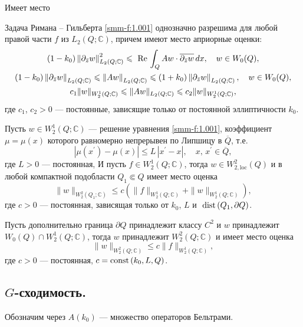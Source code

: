 Имеет место


\begin{theorem}\label{smm-th1.1}
Задача Римана -- Гильберта { \eqref{smm-f:1.001}} однозначно разрешима для любой правой части $f$ из $L_2(Q;\mathbb{C})$,
причем имеют место априорные оценки:
\begin{gather*}
(1-k_0)\left\|\partial_{\bar{z}}w\right\|^2_{L_2(Q;\mathbb{C})}\leqslant \text{ Re\,} \int_{Q} Aw\cdot \overline{\partial_{\bar{z}}w}\,dx,\quad w\in W_0(Q),\\
(1-k_0)\left\|\partial_{\bar{z}}w\right\|_{L_2(Q;\mathbb{C})}\leqslant \left\| Aw\right\|_{L_2(Q;\mathbb{C})} \leqslant
(1+k_0)\left\|\partial_{\bar{z}}w\right\|_{L_2(Q;\mathbb{C})}, \quad w\in W_0(Q),\\
	c_1\|w\|_{W^1_2(Q;\mathbb{C})}\leqslant\|Aw\|_{L_2(Q;\mathbb{C})}\leqslant c_2 \|w\|_{W^1_2(Q;\mathbb{C})},
\end{gather*}
где $c_1$, $c_2>0$ --- постоянные, зависящие только от постоянной эллиптичности $k_0$.


\hspace{5.mm} Пусть $w\in W_2^1(Q;\mathbb{C})$ --- решение уравнения  { \eqref{smm-f:1.001}}, коэффициент $\mu=\mu(x)$ которого равномерно непрерывен по Липшицу в $\overline Q$, т.е.
$$
|\mu(x^\prime)-\mu(x)|\leqslant L\,|x^\prime-x|,\quad x,\,x^\prime\in \overline{Q},
$$
где $L>0$ --- постоянная, И пусть  $f\in W_2^1(Q;\mathbb{C})$, тогда $w\in W_{2,\text{loc}}^2(Q)$ и в любой компактной подобласти $Q_1\Subset Q$ имеет место оценка
\begin{equation*}
	\|w\|_{W^2_2(Q_1; \mathbb{C})}\leqslant c\left(\|f\|_{W^1_2(Q; \mathbb{C})}+\|w\|_{W^1_2(Q; \mathbb{C})}\right),
\end{equation*}
где $c>0$ --- постоянная, зависящая только от $k_0$, $L$ и $\text{ dist\,}(Q_1,\partial Q)$.

\hspace{5.mm} Пусть дополнительно граница $\partial Q$ принадлежит классу $C^2$ и $w$ принадлежит $W_0(Q)\cap W_2^1(Q; \mathbb{C})$, тогда $w$ принадлежит $W_2^2(Q; \mathbb{C})$ и имеет место оценка
\begin{equation*}
\|w\|_{W^2_2(Q; \mathbb{C})}\leqslant c\|f\|_{W^1_2(Q; \mathbb{C})},
\end{equation*}
где $c>0$ --- постоянная, $c=\text{const\,}(k_0, L, Q)$.
\end{theorem}





\subsection{$G$-сходимость.}
Обозначим через $A(k_0)$ --- множество операторов Бельтрами.

